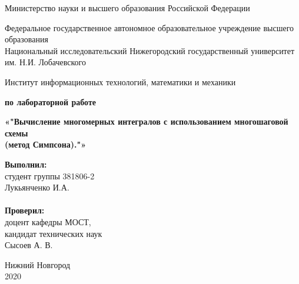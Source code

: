 \documentclass{report}
\begin{document}
\begin{titlepage}
\begin{center}
Министерство науки и высшего образования Российской Федерации
\end{center}
\begin{center}
Федеральное государственное автономное образовательное учреждение высшего образования \\
Национальный исследовательский Нижегородский государственный университет им. Н.И. Лобачевского
\end{center}
\begin{center}
Институт информационных технологий, математики и механики
\end{center}


\vspace{4em}

\begin{center}
\textbf{ по лабораторной работе} \\
\end{center}
\begin{center}
\textbf{\Large «"Вычисление многомерных интегралов с использованием многошаговой схемы\\ 
(метод Симпсона)."»}
\end{center}

\vspace{4em}

\newbox{\lbox}
\newlength{\maxl}
\setlength{\maxl}{\wd\lbox}
\hfill\parbox{7cm}{
\textbf{Выполнил:} \\ 
студент группы 381806-2 \\ 
Лукьянченко И.А.\\
\\
\textbf{Проверил:}\\ 
доцент кафедры МОСТ, \\ 
кандидат технических наук \\ 
Сысоев А. В.\\ }
\vspace{\fill}

\begin{center} Нижний Новгород \\ 2020 \end{center}

\end{titlepage}

\setcounter{page}{2}

\tableofcontents
\newpage
\end{document}
